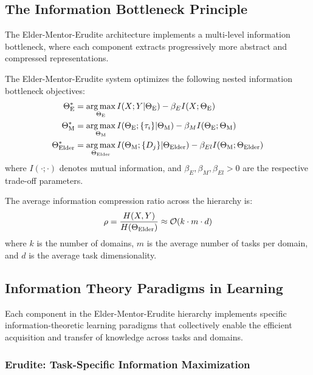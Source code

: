 \subsection{The Information Bottleneck Principle}

The Elder-Mentor-Erudite architecture implements a multi-level information bottleneck, where each component extracts progressively more abstract and compressed representations.

\begin{theorem}
The Elder-Mentor-Erudite system optimizes the following nested information bottleneck objectives:
\begin{align}
\Theta_{\text{E}}^* &= \mathop{\mathrm{arg\,max}}_{\Theta_{\text{E}}} I(X; Y | \Theta_{\text{E}}) - \beta_E I(X; \Theta_{\text{E}}) \\
\Theta_{\text{M}}^* &= \mathop{\mathrm{arg\,max}}_{\Theta_{\text{M}}} I(\Theta_{\text{E}}; \{\tau_i\} | \Theta_{\text{M}}) - \beta_M I(\Theta_{\text{E}}; \Theta_{\text{M}}) \\
\Theta_{\text{Elder}}^* &= \mathop{\mathrm{arg\,max}}_{\Theta_{\text{Elder}}} I(\Theta_{\text{M}}; \{D_j\} | \Theta_{\text{Elder}}) - \beta_{El} I(\Theta_{\text{M}}; \Theta_{\text{Elder}})
\end{align}
where $I(\cdot;\cdot)$ denotes mutual information, and $\beta_E, \beta_M, \beta_{El} > 0$ are the respective trade-off parameters.
\end{theorem}

\begin{corollary}
The average information compression ratio across the hierarchy is:
\begin{equation}
\rho = \frac{H(X, Y)}{H(\Theta_{\text{Elder}})} \approx \mathcal{O}(k \cdot m \cdot d)
\end{equation}
where $k$ is the number of domains, $m$ is the average number of tasks per domain, and $d$ is the average task dimensionality.
\end{corollary}

\subsection{Information Theory Paradigms in Learning}

Each component in the Elder-Mentor-Erudite hierarchy implements specific information-theoretic learning paradigms that collectively enable the efficient acquisition and transfer of knowledge across tasks and domains.

\subsubsection{Erudite: Task-Specific Information Maximization}

